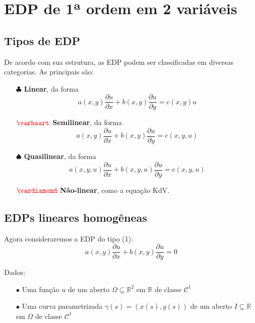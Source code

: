 \documentclass[11pt,twoside,a4paper]{book}
\begin{document}
\newpage

\section{EDP de 1ª ordem em 2 variáveis}

\subsection{Tipos de EDP}

De acordo com sua estrutura, as EDP podem ser classificadas em diversas categorias. As principais são:
\begin{itemize}
    \item[$\clubsuit$] \textbf{Linear}, da forma 
    \[
    a(x,y) \frac{\partial u}{\partial x} + b(x,y) \frac{\partial u}{\partial y} = c(x,y)u
    \]
    \item[$\textcolor{red}{\varheart}$] \textbf{Semilinear}, da forma 
    \[
    a(x,y) \frac{\partial u}{\partial x} + b(x,y) \frac{\partial u}{\partial y} = c(x,y,u)
    \]
\item[$\spadesuit$] \textbf{Quasilinear}, da forma 
    \[
    a(x,y,u) \frac{\partial u}{\partial x} + b(x,y,u) \frac{\partial u}{\partial y} = c(x,y,u)
    \]
    
 \item[$\textcolor{red}{\vardiamond}$] \textbf{Não-linear}, como a equação KdV.
\end{itemize}

\subsection{EDPs lineares homogêneas}

Agora consideraremos a EDP do tipo (1):
\begin{equation*}
    a(x,y) \frac{\partial u}{\partial x} + b(x,y) \frac{\partial u}{\partial y} = 0
\end{equation*}

\smallskip
\noindent
Dados:

\begin{enumerate}
    \item[$\bullet$] Uma função $u$ de um aberto $\Omega\subseteq\mathbb{R}^2$ em $\mathbb{R}$ de classe $\mathcal{C}^1$
    \item[$\bullet$] Uma curva parametrizada $\gamma(s)=(x(s),y(s))$ de um aberto $I\subseteq\mathbb{R}$ em $\Omega$ de classe $\mathcal{C}^1$
\end{enumerate}
\end{document}
